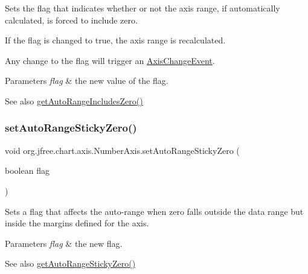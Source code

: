 Sets the flag that indicates whether or not the axis range, if automatically calculated, is forced to include zero. 

If the flag is changed to {\ttfamily true}, the axis range is recalculated. 

Any change to the flag will trigger an \mbox{\hyperlink{}{Axis\+Change\+Event}}.


\begin{DoxyParams}{Parameters}
{\em flag} & the new value of the flag.\\
\hline
\end{DoxyParams}
\begin{DoxySeeAlso}{See also}
\mbox{\hyperlink{classorg_1_1jfree_1_1chart_1_1axis_1_1_number_axis_a503dd4fb3ddf5fc3a1379e3bcec78d27}{get\+Auto\+Range\+Includes\+Zero()}} 
\end{DoxySeeAlso}
\mbox{\label{classorg_1_1jfree_1_1chart_1_1axis_1_1_number_axis_a1967bd80607d8499457992833745789f}} 
\subsubsection{\texorpdfstring{set\+Auto\+Range\+Sticky\+Zero()}{setAutoRangeStickyZero()}}
{\footnotesize\ttfamily void org.\+jfree.\+chart.\+axis.\+Number\+Axis.\+set\+Auto\+Range\+Sticky\+Zero (\begin{DoxyParamCaption}\item[{boolean}]{flag }\end{DoxyParamCaption})}

Sets a flag that affects the auto-\/range when zero falls outside the data range but inside the margins defined for the axis.


\begin{DoxyParams}{Parameters}
{\em flag} & the new flag.\\
\hline
\end{DoxyParams}
\begin{DoxySeeAlso}{See also}
\mbox{\hyperlink{classorg_1_1jfree_1_1chart_1_1axis_1_1_number_axis_a9562391142ac5e377c87a8a10614c092}{get\+Auto\+Range\+Sticky\+Zero()}} 
\end{DoxySeeAlso}
\mbox{\label{classorg_1_1jfree_1_1chart_1_1axis_1_1_number_axis_a5ce1751ba25aa3c1860c63d3c10603a9}} 
